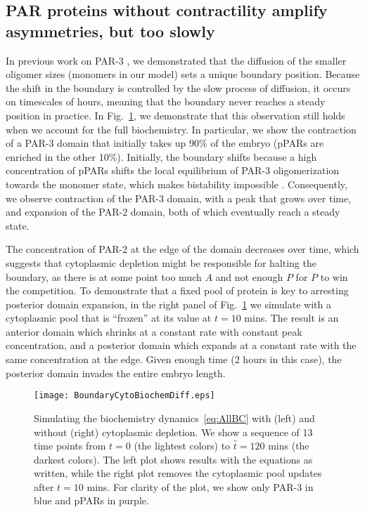 \documentclass[11pt]{article}
\newcommand{\6}[1]{#1_{\text{6}}}
\newcommand{\3}[1]{#1_{\text{3}}}
\begin{document}
\subsection{PAR proteins without contractility amplify asymmetries, but too slowly}
In previous work on PAR-3 \cite{lang2023oligomerization}, we demonstrated that the diffusion of the smaller oligomer sizes (monomers in our model) sets a unique boundary position. Because the shift in the boundary is controlled by the slow process of diffusion, it occurs on timescales of hours, meaning that the boundary never reaches a steady position in practice. In Fig.\ \ref{fig:BoundaryDiff}, we demonstrate that this observation still holds when we account for the full biochemistry. In particular, we show the contraction of a PAR-3 domain that initially takes up 90\% of the embryo (pPARs are enriched in the other 10\%). Initially, the boundary shifts because a high concentration of pPARs shifts the local equilibrium of PAR-3 oligomerization towards the monomer state, which makes bistability impossible \cite{lang2023oligomerization}. Consequently, we observe contraction of the PAR-3 domain, with a peak that grows over time, and expansion of the PAR-2 domain, both of which eventually reach a steady state. 

The concentration of PAR-2 at the edge of the domain decreases over time, which suggests that cytoplasmic depletion might be responsible for halting the boundary, as there is at some point too much $A$ and not enough $P$ for $P$ to win the competition. To demonstrate that a fixed pool of protein is key to arresting posterior domain expansion, in the right panel of Fig.\ \ref{fig:BoundaryDiff} we simulate with a cytoplasmic pool that is ``frozen'' at its value at $t = 10$ mins. The result is an anterior domain which shrinks at a constant rate with constant peak concentration, and a posterior domain which expands at a constant rate with the same concentration at the edge. Given enough time (2 hours in this case), the posterior domain invades the entire embryo length. 



\begin{figure}
\centering
\texttt{[image: BoundaryCytoBiochemDiff.eps]}
\caption{\label{fig:BoundaryDiff}Simulating the biochemistry dynamics\ \eqref{eq:AllBC} with (left) and without (right) cytoplasmic depletion. We show a sequence of 13 time points from $t = 0$ (the lightest colors) to $\hat t = 120$ mins (the darkest colors). The left plot shows results with the equations as written, while the right plot removes the cytoplasmic pool updates after $t=10$ mins. For clarity of the plot, we show only PAR-3 in blue and pPARs in purple.}
\end{figure}
\end{document}
